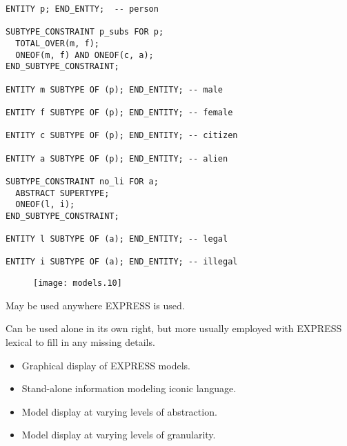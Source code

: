 \begin{remarks}
\remintro
{}

\begin{verbatim}
ENTITY p; END_ENTTY;  -- person

SUBTYPE_CONSTRAINT p_subs FOR p;
  TOTAL_OVER(m, f);
  ONEOF(m, f) AND ONEOF(c, a);
END_SUBTYPE_CONSTRAINT;

ENTITY m SUBTYPE OF (p); END_ENTITY; -- male

ENTITY f SUBTYPE OF (p); END_ENTITY; -- female

ENTITY c SUBTYPE OF (p); END_ENTITY; -- citizen

ENTITY a SUBTYPE OF (p); END_ENTITY; -- alien

SUBTYPE_CONSTRAINT no_li FOR a;
  ABSTRACT SUPERTYPE;
  ONEOF(l, i);
END_SUBTYPE_CONSTRAINT;

ENTITY l SUBTYPE OF (a); END_ENTITY; -- legal

ENTITY i SUBTYPE OF (a); END_ENTITY; -- illegal
\end{verbatim}

\remend
\end{remarks}



\begin{figure}[hp]
\centering
\texttt{[image: models.10]}

\vspace{\afttit}

\end{figure}


\begin{remarks}
\remintro
{}

    May be used anywhere EXPRESS is used.

    Can be used alone in its own right, but more usually employed with
EXPRESS lexical to fill in any missing details.

\remend
\end{remarks}


\begin{itemize}
\item Graphical display of EXPRESS models.
\item Stand-alone information modeling iconic language.
\item Model display at varying levels of abstraction.
\item Model display at varying levels of granularity.
\end{itemize}

\endinput




